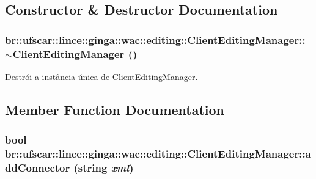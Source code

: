 \subsection{Constructor \& Destructor Documentation}
\hypertarget{classbr_1_1ufscar_1_1lince_1_1ginga_1_1wac_1_1editing_1_1ClientEditingManager_a963d65786d4e563fdb5e091c2aa3215b}{
\subsubsection[{$\sim$ClientEditingManager}]{\setlength{\rightskip}{0pt plus 5cm}br::ufscar::lince::ginga::wac::editing::ClientEditingManager::$\sim$ClientEditingManager ()}}
\label{classbr_1_1ufscar_1_1lince_1_1ginga_1_1wac_1_1editing_1_1ClientEditingManager_a963d65786d4e563fdb5e091c2aa3215b}


Destrói a instância única de \hyperlink{classbr_1_1ufscar_1_1lince_1_1ginga_1_1wac_1_1editing_1_1ClientEditingManager}{ClientEditingManager}. 



\subsection{Member Function Documentation}
\hypertarget{classbr_1_1ufscar_1_1lince_1_1ginga_1_1wac_1_1editing_1_1ClientEditingManager_a62f5c2e221cba63f7a47c3a8ce1d154f}{
\subsubsection[{addConnector}]{\setlength{\rightskip}{0pt plus 5cm}bool br::ufscar::lince::ginga::wac::editing::ClientEditingManager::addConnector (string {\em xml})}}
\label{classbr_1_1ufscar_1_1lince_1_1ginga_1_1wac_1_1editing_1_1ClientEditingManager_a62f5c2e221cba63f7a47c3a8ce1d154f}


